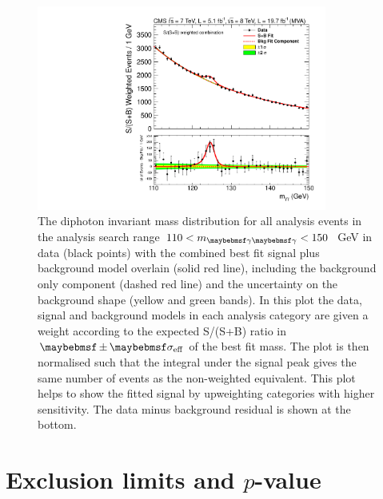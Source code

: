 \begin{figure}
  \includegraphics[width=0.85\textwidth]{results/plots/mgg_mva_110_150_combcat78TeV_weighted.pdf}
  \caption[The S/(S+B) weighted diphoton invariant mass distribution for all analysis events in data with the combined best fit signal plus background model overlain.]{The diphoton invariant mass distribution for all analysis events in the analysis search range $110<\mgg<150$~GeV in data (black points) with the combined best fit signal plus background model overlain (solid red line), including the background only component (dashed red line) and the uncertainty on the background shape (yellow and green bands). In this plot the data, signal and background models in each analysis category are given a weight according to the expected S/(S+B) ratio in $\pm\sigeff$ of the best fit mass. The plot is then normalised such that the integral under the signal peak gives the same number of events as the non-weighted equivalent. This plot helps to show the fitted signal by upweighting categories with higher sensitivity. The data minus background residual is shown at the bottom.}
  \label{fig:sbfit_w}
\end{figure}

\section{Exclusion limits and $p$-value}

